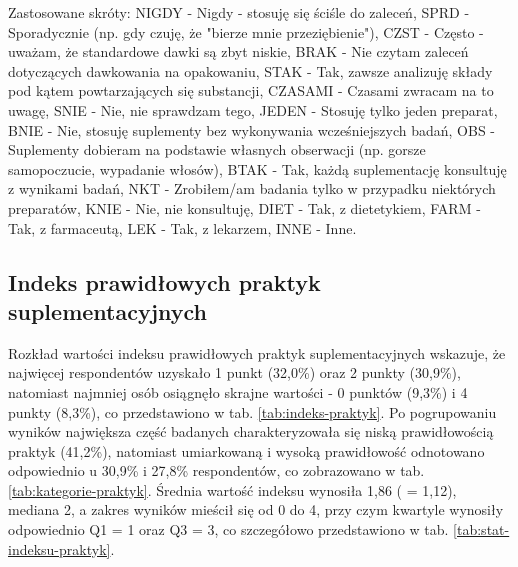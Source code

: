 \begin{table}[H]
\begin{minipage}{\textwidth}
        Zastosowane skróty: NIGDY - Nigdy - stosuję się ściśle do zaleceń, SPRD - Sporadycznie (np. gdy czuję, że "bierze mnie przeziębienie"), CZST - Często - uważam, że standardowe dawki są zbyt niskie, BRAK - Nie czytam zaleceń dotyczących dawkowania na opakowaniu, STAK - Tak, zawsze analizuję składy pod kątem powtarzających się substancji, CZASAMI - Czasami zwracam na to uwagę, SNIE - Nie, nie sprawdzam tego, JEDEN - Stosuję tylko jeden preparat, BNIE - Nie, stosuję suplementy bez wykonywania wcześniejszych badań, OBS - Suplementy dobieram na podstawie własnych obserwacji (np. gorsze samopoczucie, wypadanie włosów), BTAK - Tak, każdą suplementację konsultuję z wynikami badań, NKT - Zrobiłem/am badania tylko w przypadku niektórych preparatów, KNIE - Nie, nie konsultuję, DIET - Tak, z dietetykiem, FARM - Tak, z farmaceutą, LEK - Tak, z lekarzem, INNE - Inne.
    \end{minipage}
\end{table}


\subsection{Indeks prawidłowych praktyk suplementacyjnych}




Rozkład wartości indeksu prawidłowych praktyk suplementacyjnych wskazuje, że najwięcej respondentów uzyskało 1 punkt (32,0\%) oraz 2 punkty (30,9\%), natomiast najmniej osób osiągnęło skrajne wartości - 0 punktów (9,3\%) i 4 punkty (8,3\%), co przedstawiono w tab. \ref{tab:indeks-praktyk}. Po pogrupowaniu wyników największa część badanych charakteryzowała się niską prawidłowością praktyk (41,2\%), natomiast umiarkowaną i wysoką prawidłowość odnotowano odpowiednio u 30,9\% i 27,8\% respondentów, co zobrazowano w tab. \ref{tab:kategorie-praktyk}. Średnia wartość indeksu wynosiła 1,86 ( = 1,12), mediana 2, a zakres wyników mieścił się od 0 do 4, przy czym kwartyle wynosiły odpowiednio Q1 = 1 oraz Q3 = 3, co szczegółowo przedstawiono w tab. \ref{tab:stat-indeksu-praktyk}.

